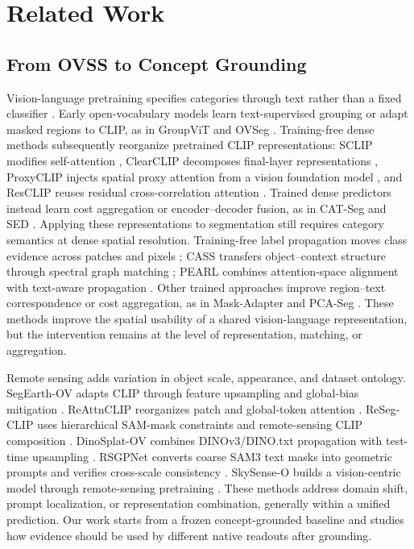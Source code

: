 \section{Related Work}
\label{sec:related_work}

\subsection{From OVSS to Concept Grounding}

Vision-language pretraining specifies categories through text rather than a fixed classifier \cite{R01}. Early open-vocabulary models learn text-supervised grouping or adapt masked regions to CLIP, as in GroupViT \cite{R45} and OVSeg \cite{R46}. Training-free dense methods subsequently reorganize pretrained CLIP representations: SCLIP modifies self-attention \cite{R29}, ClearCLIP decomposes final-layer representations \cite{R30}, ProxyCLIP injects spatial proxy attention from a vision foundation model \cite{R31}, and ResCLIP reuses residual cross-correlation attention \cite{R47}. Trained dense predictors instead learn cost aggregation or encoder--decoder fusion, as in CAT-Seg \cite{R48} and SED \cite{R49}. Applying these representations to segmentation still requires category semantics at dense spatial resolution. Training-free label propagation moves class evidence across patches and pixels \cite{R02}; CASS transfers object--context structure through spectral graph matching \cite{R03}; PEARL combines attention-space alignment with text-aware propagation \cite{R04}. Other trained approaches improve region--text correspondence or cost aggregation, as in Mask-Adapter \cite{R05} and PCA-Seg \cite{R17}. These methods improve the spatial usability of a shared vision-language representation, but the intervention remains at the level of representation, matching, or aggregation.

Remote sensing adds variation in object scale, appearance, and dataset ontology. SegEarth-OV adapts CLIP through feature upsampling and global-bias mitigation \cite{R06}. ReAttnCLIP reorganizes patch and global-token attention \cite{R07}. ReSeg-CLIP uses hierarchical SAM-mask constraints and remote-sensing CLIP composition \cite{R28}. DinoSplat-OV combines DINOv3/DINO.txt propagation with test-time upsampling \cite{R27}. RSGPNet converts coarse SAM3 text masks into geometric prompts and verifies cross-scale consistency \cite{R25}. SkySense-O builds a vision-centric model through remote-sensing pretraining \cite{R21}. These methods address domain shift, prompt localization, or representation combination, generally within a unified prediction. Our work starts from a frozen concept-grounded baseline and studies how evidence should be used by different native readouts after grounding.

